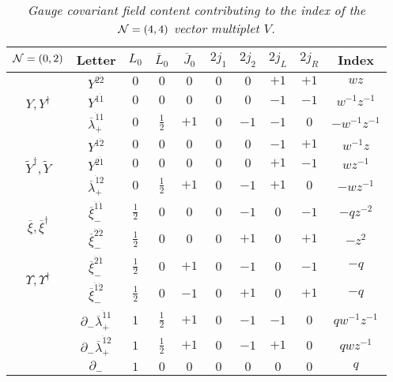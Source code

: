 \documentclass[main.tex]{subfiles}
\begin{document}
\begin{table}
\centering
 \begin{tabular}{|c|c|c|c|c|c|c|c|c|c|} 
 \hline
$\mathcal{N}=(0,2)$ & Letter & $L_0$& $\overline{L}_0$& $\overline{J}_0$ &$2j_1$&$2j_2$& $2j_L$&$2j_R$ & Index\\[2pt]\hline
\hline
\multirow{ 3}{*}{$Y,Y^{\dagger}$}&$Y^{2\dot2}$ &$0$ & $0$&$0$& $0$&$0$&$+1$ &$+1$& $wz$\\[2pt]\cline{2-10}
&$Y^{1\dot1}$ &$0$ & $0$& $0$&$0$&$0$&$-1$ & $-1$ & $w^{-1}z^{-1}$\\\cline{2-10}
&$\overline{\lambda}_{+}^{\dot11}$ &$0$&$\frac{1}{2}$ & $+1$&$0$&$-1$& $-1$ & $0$ & $-w^{-1}z^{-1}$\\\hline
\multirow{ 3}{*}{$\tilde{Y}^{\dagger},\tilde{Y}$}&$Y^{1\dot2}$ & $0$ & $0$&$0$&$0$&$0$& $-1$& $+1$ & $w^{-1}z$\\\cline{2-10}
&$Y^{2\dot1}$ &$0$ & $0$& $0$&$0$&$0$&$+1$ & $-1$ & $wz^{-1}$\\\cline{2-10}
&$\overline{\lambda}_{+}^{\dot12}$ &$0$&$\frac{1}{2}$ & $+1$ &$0$&$-1$& $+1$& $0$&$-wz^{-1}$\\\hline
\multirow{ 2}{*}{$\overline{\xi},\overline{\xi}^{\dagger}$} &$\overline{\xi}_{-}^{\dot1\dot1}$ &$\frac{1}{2}$&$0$ & $0$&$0$&$-1$ & $0$ & $-1$ & $-qz^{-2}$\\\cline{2-10}
&$\overline{\xi}_{-}^{\dot2\dot2}$ &$\frac{1}{2}$ & $0$ & $0$ &$0$&$+1$& $0$ & $+1$ & $-z^2$\\\hline
\multirow{ 2}{*}{$\Upsilon,\Upsilon^{\dagger}$}&$\overline{\xi}_{-}^{\dot2\dot1}$& $\frac{1}{2}$&$0$ & $+1$ &$0$&$-1$& $0$ & $-1$ & $-q$\\\cline{2-10}
&$\overline{\xi}_{-}^{\dot1\dot2}$ &$\frac{1}{2}$&$0$ & $-1$ &$0$&$+1$& $0$ &$+1$& $-q$\\\hline
\hline
\multirow{ 2}{*}{}&$\partial_-\overline{\lambda}_{+}^{\dot11}$ &$1$&$\frac{1}{2}$ & $+1$ &$0$&$-1$& $-1$& $0$&$qw^{-1}z^{-1}$\\\cline{2-10}
&$\partial_-\overline{\lambda}_{+}^{\dot12}$ &$1$&$\frac{1}{2}$ & $+1$ &$0$&$-1$& $+1$& $0$& $qwz^{-1}$\\\hline
\hline
&$\partial_{-}$ &$1$&$0$ &$0$& $0$ & $0$&$0$&$0$ & $q$\\\hline
\end{tabular}
\caption{\it Gauge covariant field content contributing to the index of the $\mathcal{N}=(4,4)$ vector multiplet $V$.}
 \label{tab:Vletters}
\end{table}
\end{document}
